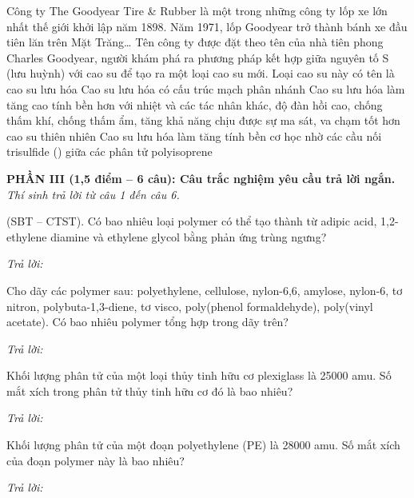 \documentclass[11pt,a4paper]{article}
\def\loigiai#1{}
\begin{document}
\begin{ex}
Công ty The Goodyear Tire \& Rubber là một trong những công ty lốp xe lớn nhất thế giới khởi lập năm 1898. Năm 1971, lốp Goodyear trở thành bánh xe đầu tiên lăn trên Mặt Trăng\dots{} Tên công ty được đặt theo tên của nhà tiên phong Charles Goodyear, người khám phá ra phương pháp kết hợp giữa nguyên tố S (lưu huỳnh) với cao su để tạo ra một loại cao su mới.
\choiceTF
{Loại cao su này có tên là cao su lưu hóa}
{Cao su lưu hóa có cấu trúc mạch phân nhánh}
{Cao su lưu hóa làm tăng cao tính bền hơn với nhiệt và các tác nhân khác, độ đàn hồi cao, chống thấm khí, chống thấm ẩm, tăng khả năng chịu được sự ma sát, va chạm tốt hơn cao su thiên nhiên}
{Cao su lưu hóa làm tăng tính bền cơ học nhờ các cầu nối trisulfide () giữa các phân tử polyisoprene}
\loigiai{}
\end{ex}

\newpage

\noindent
\textbf{PHẦN III (1,5 điểm -- 6 câu): Câu trắc nghiệm yêu cầu trả lời ngắn.}\\
\textit{Thí sinh trả lời từ câu 1 đến câu 6.}

\setcounter{ex}{0}

\begin{ex}
(SBT -- CTST). Có bao nhiêu loại polymer có thể tạo thành từ adipic acid, 1,2-ethylene diamine và ethylene glycol bằng phản ứng trùng ngưng?
\par\noindent\textit{Trả lời:} \dotfill
\loigiai{}
\end{ex}

\begin{ex}
Cho dãy các polymer sau: polyethylene, cellulose, nylon-6,6, amylose, nylon-6, tơ nitron, polybuta-1,3-diene, tơ visco, poly(phenol formaldehyde), poly(vinyl acetate). Có bao nhiêu polymer tổng hợp trong dãy trên?
\par\noindent\textit{Trả lời:} \dotfill
\loigiai{}
\end{ex}

\begin{ex}
Khối lượng phân tử của một loại thủy tinh hữu cơ plexiglass là 25000 amu. Số mắt xích trong phân tử thủy tinh hữu cơ đó là bao nhiêu?
\par\noindent\textit{Trả lời:} \dotfill
\loigiai{}
\end{ex}

\begin{ex}
Khối lượng phân tử của một đoạn polyethylene (PE) là 28000 amu. Số mắt xích của đoạn polymer này là bao nhiêu?
\par\noindent\textit{Trả lời:} \dotfill
\loigiai{}
\end{ex}
\end{document}
